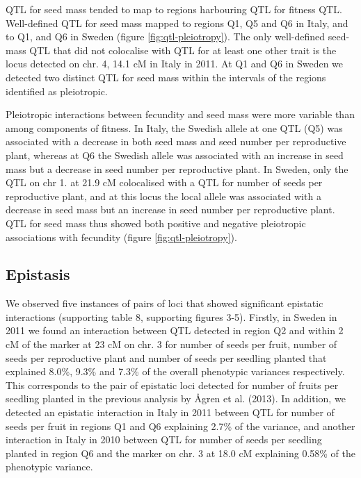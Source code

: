 \documentclass[]{article}
\begin{document}
QTL for seed mass tended to map to regions harbouring QTL for fitness QTL.
Well-defined QTL for seed mass mapped to regions Q1, Q5 and Q6 in Italy, and to Q1, and Q6 in Sweden (figure \ref{fig:qtl-pleiotropy}).
The only well-defined seed-mass QTL that did not colocalise with QTL for at least one other trait is the locus detected on chr. 4, 14.1 cM in Italy in 2011.
At Q1 and Q6 in Sweden we detected two distinct QTL for seed mass within the intervals of the regions identified as pleiotropic.

Pleiotropic interactions between fecundity and seed mass were more variable than among components of fitness.
In Italy, the Swedish allele at one QTL (Q5) was associated with a decrease in both seed mass and seed number per reproductive plant, whereas at Q6 the Swedish allele was associated with an increase in seed mass but a decrease in seed number per reproductive plant.
In Sweden, only the QTL on chr 1. at 21.9 cM colocalised with a QTL for number of seeds per reproductive plant, and at this locus the local allele was associated with a decrease in seed mass but an increase in seed number per reproductive plant.
QTL for seed mass thus showed both positive and negative pleiotropic associations with fecundity (figure \ref{fig:qtl-pleiotropy}).

\hypertarget{epistasis}{%
\subsection{Epistasis}\label{epistasis}}

We observed five instances of pairs of loci that showed significant epistatic interactions (supporting table 8, supporting figures 3-5).
Firstly, in Sweden in 2011 we found an interaction between QTL detected in region Q2 and within 2 cM of the marker at 23 cM on chr. 3 for number of seeds per fruit, number of seeds per reproductive plant and number of seeds per seedling planted that explained 8.0\%, 9.3\% and 7.3\% of the overall phenotypic variances respectively.
This corresponds to the pair of epistatic loci detected for number of fruits per seedling planted in the previous analysis by Ågren et al. (2013).
In addition, we detected an epistatic interaction in Italy in 2011 between QTL for number of seeds per fruit in regions Q1 and Q6 explaining 2.7\% of the variance, and another interaction in Italy in 2010 between QTL for number of seeds per seedling planted in region Q6 and the marker on chr. 3 at 18.0 cM explaining 0.58\% of the phenotypic variance.
\end{document}
